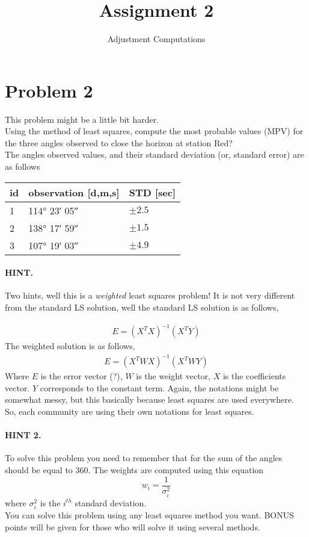 \documentclass[]{scrartcl}
\title{Assignment 2}
\author{Adjustment Computations}
\begin{document}
\maketitle

\section{Problem 2}
This problem might be a little bit harder.\\
Using the method of least squares, compute the most probable values (MPV) for the three angles observed to close the horizon at station Red?
\\
The angles observed values, and their standard deviation (or, standard error) are as follows

\begin{table}[]
	\centering
	\label{table:table-1}
	\begin{tabular}{@{}lll@{}}
		\toprule
		id & observation [d,m,s]& STD [sec]\\
		\midrule
		1 & \ang{114; 23; 05} & $\pm 2.5$\\
		2 & \ang{138; 17; 59} & $\pm 1.5$\\
		3 & \ang{107; 19; 03} & $\pm 4.9$\\
		\bottomrule
	\end{tabular}
\end{table}

\paragraph{HINT.}Two hints, well this is a \textit{weighted} least squares problem! It is not very different from the standard LS solution, well the standard LS solution is as follows,

\begin{eqnarray}
E = (X^TX)^{-1}(X^TY)
\end{eqnarray}
The weighted solution is as follows,
\begin{eqnarray}
E = (X^TWX)^{-1}(X^TWY)
\end{eqnarray}
Where $E$ is the error vector (?), $W$ is the weight vector, $X$ is the coefficients vector. $Y$ corresponds to the constant term.
Again, the notations might be somewhat messy, but this basically because least squares are used everywhere. So, each community are using their own notations for least squares.
\paragraph{HINT 2.}To solve this problem you need to remember that for the sum of the angles should be equal to 360. The weights are computed using this equation
\begin{equation}
	w_i = \frac{1}{\sigma^2_i}
\end{equation}
where $\sigma^2_i$ is the $i^{th}$ standard deviation.
\\
You can solve this problem using any least squares method you want. BONUS points will be given for those who will solve it using several methods.
\end{document}
